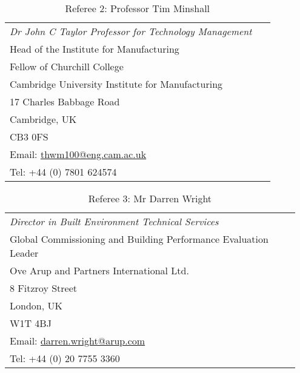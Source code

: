 \documentclass[11pt, oneside]{article}   	%
\begin{document}
\begin{table}[h]
\vspace{-5mm}
\caption*{Referee 2: Professor Tim Minshall}
\vspace{-5mm}
\small
\begin{center}
\begin{tabular}{p{0.95\linewidth}}
\hline
\emph{Dr John C Taylor Professor for Technology Management}\\
Head of the Institute for Manufacturing\\
Fellow of Churchill College\\
Cambridge University Institute for Manufacturing\\
17 Charles Babbage Road\\
Cambridge, UK\\
CB3 0FS\\
Email: \href{mailto:thwm100@eng.cam.ac.uk}{thwm100@eng.cam.ac.uk}\\
Tel: +44 (0) 7801 624574\\
\hline
\end{tabular}
\end{center}
\vspace{-10mm}
\end{table}


\begin{table}[h]
\vspace{-5mm}
\caption*{Referee 3: Mr Darren Wright}
\vspace{-5mm}
\small
\begin{center}
\begin{tabular}{p{0.95\linewidth}}
\hline
\emph{Director in Built Environment Technical Services}\\
Global Commissioning and Building Performance Evaluation Leader\\
Ove Arup and Partners International Ltd.\\
8 Fitzroy Street\\
London, UK\\
W1T 4BJ\\
Email: \href{mailto:darren.wright@arup.com}{darren.wright@arup.com}\\
Tel: +44 (0) 20 7755 3360\\
\hline
\end{tabular}
\end{center}
\vspace{-10mm}
\end{table}
\end{document}
